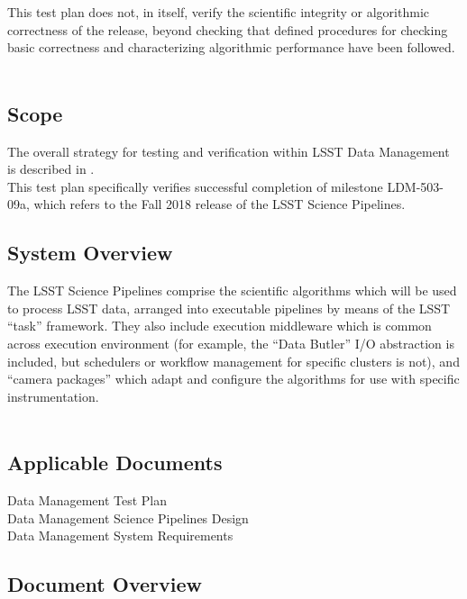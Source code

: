 \documentclass[DM,lsstdraft,STR,toc]{lsstdoc}
\begin{document}
This test plan does not, in itself, verify the scientific integrity or
algorithmic correctness of the release, beyond checking that defined
procedures for checking basic correctness and characterizing algorithmic
performance have been followed.\\
~\\

\hypertarget{scope}{%
\subsection{Scope}\label{scope}}

The overall strategy for testing and verification within LSST Data
Management is described in .\\
This test plan specifically verifies successful completion of milestone
LDM-503-09a, which refers to the Fall 2018 release of the LSST Science
Pipelines.



\subsection{System Overview}
\label{sect:systemoverview}

The LSST Science Pipelines comprise the scientific algorithms which will
be used to process LSST data, arranged into executable pipelines by
means of the LSST ``task'' framework. They also include execution
middleware which is common across execution environment (for example,
the ``Data Butler'' I/O abstraction is included, but schedulers or
workflow management for specific clusters is not), and ``camera
packages'' which adapt and configure the algorithms for use with
specific instrumentation.\\
~\\

\hypertarget{applicable-documents}{%
\subsection{\texorpdfstring{Applicable Documents\\
}{Applicable Documents }}\label{applicable-documents}}

 Data Management Test Plan\\
 Data Management Science Pipelines Design\\
 Data Management System Requirements


\subsection{Document Overview}
\label{sect:docoverview}
\end{document}
